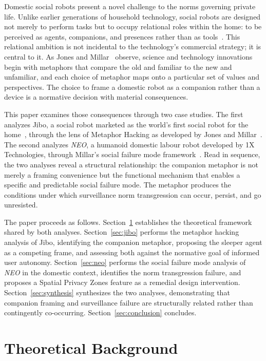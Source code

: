 \documentclass{ieee-portfolio}
\newcommand{\neo}{\textit{NEO}}
\begin{document}
Domestic social robots present a novel challenge to the norms governing private life. Unlike earlier generations of household technology, social robots are designed not merely to perform tasks but to occupy relational roles within the home: to be perceived as agents, companions, and presences rather than as tools~\cite{ananto_robot_pets_2020}. This relational ambition is not incidental to the technology's commercial strategy; it is central to it. As Jones and Millar~\cite{jones_hacking_2017} observe, science and technology innovations begin with metaphors that compare the old and familiar to the new and unfamiliar, and each choice of metaphor maps onto a particular set of values and perspectives. The choice to frame a domestic robot as a companion rather than a device is a normative decision with material consequences.

This paper examines those consequences through two case studies. The first analyzes Jibo, a social robot marketed as the world's first social robot for the home~\cite{breazeal_jibo_2014}, through the lens of Metaphor Hacking as developed by Jones and Millar~\cite{jones_hacking_2017}. The second analyzes \neo{}, a humanoid domestic labour robot developed by 1X Technologies, through Millar's social failure mode framework~\cite{millar_social_2020}. Read in sequence, the two analyses reveal a structural relationship: the companion metaphor is not merely a framing convenience but the functional mechanism that enables a specific and predictable social failure mode. The metaphor produces the conditions under which surveillance norm transgression can occur, persist, and go unresisted.

The paper proceeds as follows. Section~\ref{sec:background} establishes the theoretical framework shared by both analyses. Section~\ref{sec:jibo} performs the metaphor hacking analysis of Jibo, identifying the companion metaphor, proposing the sleeper agent as a competing frame, and assessing both against the normative goal of informed user autonomy. Section~\ref{sec:neo} performs the social failure mode analysis of \neo{} in the domestic context, identifies the norm transgression failure, and proposes a Spatial Privacy Zones feature as a remedial design intervention. Section~\ref{sec:synthesis} synthesizes the two analyses, demonstrating that companion framing and surveillance failure are structurally related rather than contingently co-occurring. Section~\ref{sec:conclusion} concludes.

\section{Theoretical Background}
\label{sec:background}
\end{document}
